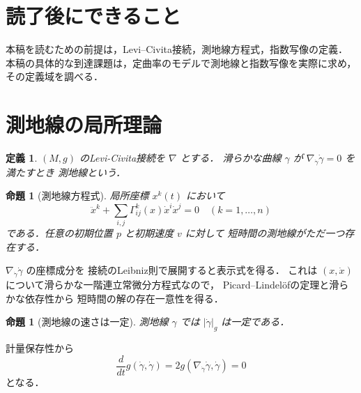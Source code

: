 \documentclass[a5paper,10pt,onecolumn]{jsarticle}
\makeatletter
\theoremstyle{mathnotetheorem}
\newtheorem{definition}[theorem]{定義}
\newtheorem{proposition}[theorem]{命題}
\renewcommand{\proofname}{証明}
\renewenvironment{proof}[1][\proofname]{%
  \par\pushQED{\qed}\normalfont\topsep4\p@\@plus2\p@\relax
  \trivlist\item[\hskip\labelsep\bfseries #1]\ignorespaces
}{\popQED\endtrivlist\@endpefalse}
\makeatother
\begin{document}
\section*{読了後にできること}
本稿を読むための前提は，Levi--Civita接続，測地線方程式，指数写像の定義．
本稿の具体的な到達課題は，定曲率のモデルで測地線と指数写像を実際に求め，その定義域を調べる．


\section{測地線の局所理論}
\begin{definition}
$(M,g)$ のLevi-Civita接続を $\nabla$ とする．
滑らかな曲線 $\gamma$ が
$\nabla_{\dot\gamma}\dot\gamma=0$ を満たすとき
測地線という．
\end{definition}
\begin{proposition}[測地線方程式]\label{prop:geod}
局所座標 $x^k(t)$ において
\[
 \ddot x^k+\sum_{i,j}\Gamma^k_{ij}(x)\dot x^i\dot x^j=0
 \quad(k=1,\dots,n)
\]
である．任意の初期位置 $p$ と初期速度 $v$ に対して
短時間の測地線がただ一つ存在する．
\end{proposition}
\begin{proof}
$\nabla_{\dot\gamma}\dot\gamma$ の座標成分を
接続のLeibniz則で展開すると表示式を得る．
これは $(x,\dot x)$ について滑らかな一階連立常微分方程式なので，
Picard--Lindel\"ofの定理と滑らかな依存性から
短時間の解の存在一意性を得る．
\end{proof}
\begin{proposition}[測地線の速さは一定]
測地線 $\gamma$ では $|\dot\gamma|_g$ は一定である．
\end{proposition}
\begin{proof}
計量保存性から
\[
 \frac d{dt}g(\dot\gamma,\dot\gamma)
 =2g(\nabla_{\dot\gamma}\dot\gamma,\dot\gamma)=0
\]
となる．
\end{proof}
\end{document}

